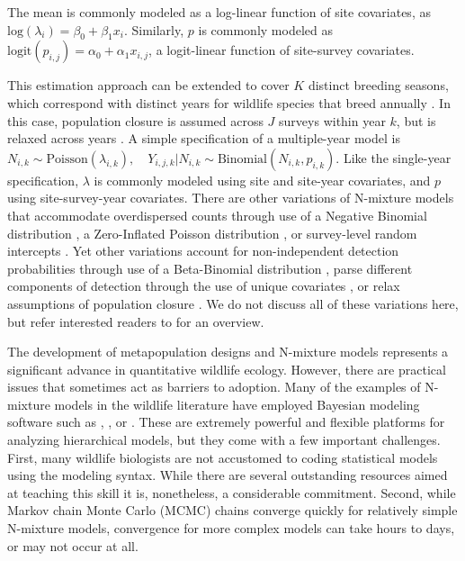 \documentclass[article]{jss}
\begin{document}
The mean is commonly modeled as a log-linear function of site covariates, as $\text{log}(\lambda_i) = \beta_0 + \beta_1x_i$. Similarly, $p$ is commonly modeled as $\text{logit}(p_{i,j}) = \alpha_0 + \alpha_1x_{i,j}$, a logit-linear function of site-survey covariates.

This estimation approach can be extended to cover $K$ distinct breeding seasons, which correspond with distinct years for wildlife species that breed annually \citep{Kery_Dorazio_Soldaat_Van_Strien_Zuiderwijk_Royle_2009}. In this case, population closure is assumed across $J$ surveys within year $k$, but is relaxed across years \citep{Kery_Dorazio_Soldaat_Van_Strien_Zuiderwijk_Royle_2009}. A simple specification of a multiple-year model is $N_{i,k} \sim \text{Poisson}(\lambda_{i,k}), \quad Y_{i,j,k} | N_{i,k} \sim \text{Binomial}(N_{i,k}, p_{i,k})$. Like the single-year specification, $\lambda$ is commonly modeled using site and site-year covariates, and $p$ using site-survey-year covariates. There are other variations of N-mixture models that accommodate overdispersed counts through use of a Negative Binomial distribution \citep{Kery_Royle_2010}, a Zero-Inflated Poisson distribution \citep{Wenger_Freeman_2008}, or survey-level random intercepts \citep{Kery_Schaub_2011}. Yet other variations account for non-independent detection probabilities through use of a Beta-Binomial distribution \citep{Martin_Royle_Mackenzie_Edwards_Kery_Gardner_2011}, parse different components of detection through the use of unique covariates \citep{O'Donnell_Thompson_III_Semlitsch_2015}, or relax assumptions of population closure \citep{Chandler_Royle_King_2011, Dail_Madsen_2011}. We do not discuss all of these variations here, but refer interested readers to \cite{Denes_Silveira_Beissinger_2015} for an overview.

The development of metapopulation designs and N-mixture models represents a significant advance in quantitative wildlife ecology. However, there are practical issues that sometimes act as barriers to adoption. Many of the examples of N-mixture models in the wildlife literature have employed Bayesian modeling software such as , , or  \citep{plummer2003jags,Lunn_Jackson_Best_Thomas_Spiegelhalter_2012}. These are extremely powerful and flexible platforms for analyzing hierarchical models, but they come with a few important challenges.  First, many wildlife biologists are not accustomed to coding statistical models using the  modeling syntax. While there are several outstanding resources aimed at teaching this skill \citep{Royle_Dorazio_2008, Kery_2010, Kery_Schaub_2011, Kery_Royle_2015} it is, nonetheless, a considerable commitment. Second, while Markov chain Monte Carlo (MCMC) chains converge quickly for relatively simple N-mixture models, convergence for more complex models can take hours to days, or may not occur at all.
\end{document}
